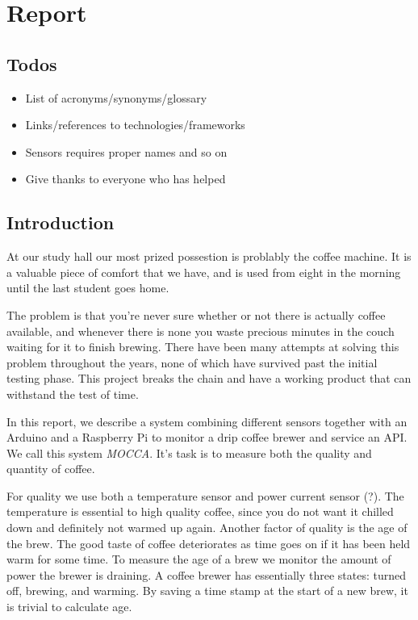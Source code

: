 \documentclass[12pt,a4paper,oneside,article]{memoir}
\numberwithin{equation}{chapter}
\begin{document}
\clearpage

\chapter{Report}
\section*{Todos}
\begin{itemize}
\item List of acronyms/synonyms/glossary
\item Links/references to technologies/frameworks
\item Sensors requires proper names and so on
\item Give thanks to everyone who has helped
\end{itemize}

\section{Introduction}\label{sec:introduction}
At our study hall our most prized possestion is problably the coffee 
machine. It is a valuable piece of comfort that we have, and is used from eight 
in the morning until the last student goes home.

The problem is that you're never sure whether or not there is actually coffee
available, and whenever there is none you waste precious minutes in the couch
waiting for it to finish brewing. There have been many attempts at solving this
problem throughout the years, none of which have survived past the initial
testing phase. This project breaks the chain and have a working product that can
withstand the test of time.

In this report, we describe a system combining different sensors together with
an Arduino and a Raspberry Pi to monitor a drip coffee brewer and service an 
API. We call this system \textit{MOCCA}. It's task is to measure both the 
quality and quantity of coffee.

For quality we use both a temperature sensor and power current sensor (?). The
temperature is essential to high quality coffee, since you do not want it
chilled down and definitely not warmed up again. Another factor of quality is
the age of the brew. The good taste of coffee deteriorates as time goes on if it
has been held warm for some time. To measure the age of a brew we monitor the
amount of power the brewer is draining. A coffee brewer has essentially three
states: turned off, brewing, and warming. By saving a time stamp at the start of
a new brew, it is trivial to calculate age.
\end{document}
